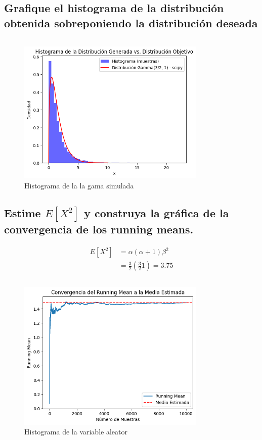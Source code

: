 \documentclass{article}
\begin{document}
\subsection{Grafique el histograma de la distribución obtenida sobreponiendo la distribución deseada}
\begin{pythonbox}
	\inputminted{python}{accept_graph.py}
\end{pythonbox}
\begin{figure}[H]
	\centering
	\includegraphics[width=0.8\textwidth]{gamma.png}
	\caption{Histograma de la la gama simulada}
\end{figure}


\subsection{Estime $E[X^2]$ y construya la gráfica de la convergencia de los running means.}

\[
	\begin{split}
		E[X^2] & = \alpha(\alpha + 1)\beta^2      \\
		       & = \frac{3}{2}(\frac{3}{2}1)=3.75
	\end{split}
\]
\begin{pythonbox}[title={The }]
	\inputminted{python}{test.py}
\end{pythonbox}

\begin{figure}[H]
	\centering
	\includegraphics[width=0.8\textwidth]{gama_sum.png}
	\caption{Histograma de la variable aleator}
\end{figure}
\end{document}
